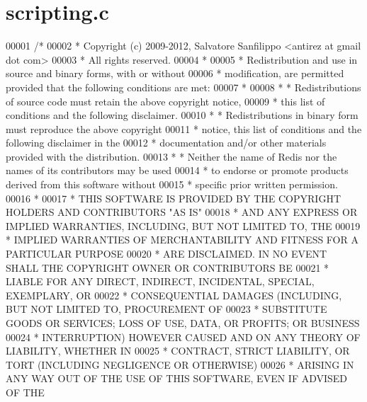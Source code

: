\hypertarget{scripting_8c_source}{}\section{scripting.\+c}
\label{scripting_8c_source}

\begin{DoxyCode}
00001 \textcolor{comment}{/*}
00002 \textcolor{comment}{ * Copyright (c) 2009-2012, Salvatore Sanfilippo <antirez at gmail dot com>}
00003 \textcolor{comment}{ * All rights reserved.}
00004 \textcolor{comment}{ *}
00005 \textcolor{comment}{ * Redistribution and use in source and binary forms, with or without}
00006 \textcolor{comment}{ * modification, are permitted provided that the following conditions are met:}
00007 \textcolor{comment}{ *}
00008 \textcolor{comment}{ *   * Redistributions of source code must retain the above copyright notice,}
00009 \textcolor{comment}{ *     this list of conditions and the following disclaimer.}
00010 \textcolor{comment}{ *   * Redistributions in binary form must reproduce the above copyright}
00011 \textcolor{comment}{ *     notice, this list of conditions and the following disclaimer in the}
00012 \textcolor{comment}{ *     documentation and/or other materials provided with the distribution.}
00013 \textcolor{comment}{ *   * Neither the name of Redis nor the names of its contributors may be used}
00014 \textcolor{comment}{ *     to endorse or promote products derived from this software without}
00015 \textcolor{comment}{ *     specific prior written permission.}
00016 \textcolor{comment}{ *}
00017 \textcolor{comment}{ * THIS SOFTWARE IS PROVIDED BY THE COPYRIGHT HOLDERS AND CONTRIBUTORS "AS IS"}
00018 \textcolor{comment}{ * AND ANY EXPRESS OR IMPLIED WARRANTIES, INCLUDING, BUT NOT LIMITED TO, THE}
00019 \textcolor{comment}{ * IMPLIED WARRANTIES OF MERCHANTABILITY AND FITNESS FOR A PARTICULAR PURPOSE}
00020 \textcolor{comment}{ * ARE DISCLAIMED. IN NO EVENT SHALL THE COPYRIGHT OWNER OR CONTRIBUTORS BE}
00021 \textcolor{comment}{ * LIABLE FOR ANY DIRECT, INDIRECT, INCIDENTAL, SPECIAL, EXEMPLARY, OR}
00022 \textcolor{comment}{ * CONSEQUENTIAL DAMAGES (INCLUDING, BUT NOT LIMITED TO, PROCUREMENT OF}
00023 \textcolor{comment}{ * SUBSTITUTE GOODS OR SERVICES; LOSS OF USE, DATA, OR PROFITS; OR BUSINESS}
00024 \textcolor{comment}{ * INTERRUPTION) HOWEVER CAUSED AND ON ANY THEORY OF LIABILITY, WHETHER IN}
00025 \textcolor{comment}{ * CONTRACT, STRICT LIABILITY, OR TORT (INCLUDING NEGLIGENCE OR OTHERWISE)}
00026 \textcolor{comment}{ * ARISING IN ANY WAY OUT OF THE USE OF THIS SOFTWARE, EVEN IF ADVISED OF THE}

\end{DoxyCode}
